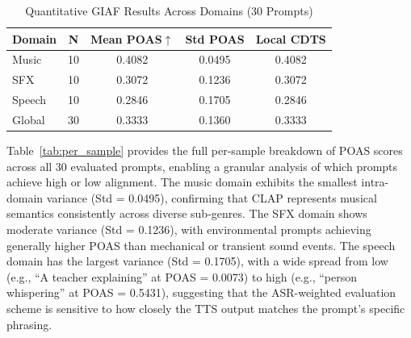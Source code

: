 \documentclass[journal]{IEEEtran}
\begin{document}
\begin{table}[!t]
  \renewcommand{\arraystretch}{1.3}
  \caption{Quantitative GIAF Results Across Domains (30 Prompts)}
  \label{tab:main_results}
  \centering
  \begin{tabular}{|l|c|c|c|c|}
  \hline
  \textbf{Domain} & \textbf{N} &
  \textbf{Mean POAS}$\uparrow$ &
  \textbf{Std POAS} & \textbf{Local CDTS} \\
  \hline
  Music   & 10 & 0.4082 & 0.0495 & 0.4082 \\
  SFX     & 10 & 0.3072 & 0.1236 & 0.3072 \\
  Speech  & 10 & 0.2846 & 0.1705 & 0.2846 \\
  \hline
  Global  & 30 & 0.3333 & 0.1360 & 0.3333 \\
  \hline
  \end{tabular}
\end{table}

Table~\ref{tab:per_sample} provides the full per-sample breakdown of
POAS scores across all 30 evaluated prompts, enabling a granular
analysis of which prompts achieve high or low alignment. The music
domain exhibits the smallest intra-domain variance (Std = 0.0495),
confirming that CLAP represents musical semantics consistently across
diverse sub-genres. The SFX domain shows moderate variance
(Std = 0.1236), with environmental prompts achieving generally higher
POAS than mechanical or transient sound events. The speech domain has the
largest variance (Std = 0.1705), with a wide spread from low (e.g.,
``A teacher explaining'' at POAS = 0.0073) to high (e.g., ``person
whispering'' at POAS = 0.5431), suggesting that the ASR-weighted
evaluation scheme is sensitive to how closely the TTS output
matches the prompt's specific phrasing.
\end{document}
